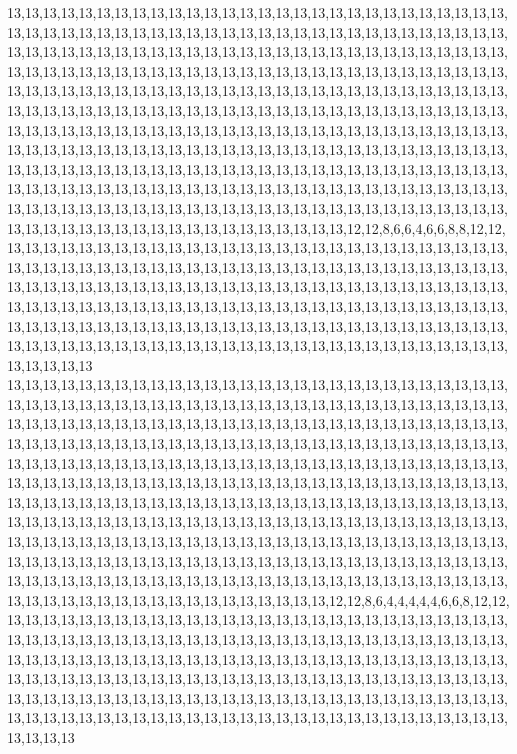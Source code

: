 13,13,13,13,13,13,13,13,13,13,13,13,13,13,13,13,13,13,13,13,13,13,13,13,13,13,13,13,13,13,13,13,13,13,13,13,13,13,13,13,13,13,13,13,13,13,13,13,13,13,13,13,13,13,13,13,13,13,13,13,13,13,13,13,13,13,13,13,13,13,13,13,13,13,13,13,13,13,13,13,13,13,13,13,13,13,13,13,13,13,13,13,13,13,13,13,13,13,13,13,13,13,13,13,13,13,13,13,13,13,13,13,13,13,13,13,13,13,13,13,13,13,13,13,13,13,13,13,13,13,13,13,13,13,13,13,13,13,13,13,13,13,13,13,13,13,13,13,13,13,13,13,13,13,13,13,13,13,13,13,13,13,13,13,13,13,13,13,13,13,13,13,13,13,13,13,13,13,13,13,13,13,13,13,13,13,13,13,13,13,13,13,13,13,13,13,13,13,13,13,13,13,13,13,13,13,13,13,13,13,13,13,13,13,13,13,13,13,13,13,13,13,13,13,13,13,13,13,13,13,13,13,13,13,13,13,13,13,13,13,13,13,13,13,13,13,13,13,13,13,13,13,13,13,13,13,13,13,13,13,13,13,13,13,13,13,13,13,13,13,13,13,13,13,13,13,13,13,13,13,13,13,13,13,13,13,13,13,13,13,13,13,13,13,13,13,13,13,13,13,13,13,13,13,13,13,13,13,13,13,13,13,13,13,13,13,13,13,13,13,13,13,13,13,13,13,13,12,12,8,6,6,4,6,6,8,8,12,12,13,13,13,13,13,13,13,13,13,13,13,13,13,13,13,13,13,13,13,13,13,13,13,13,13,13,13,13,13,13,13,13,13,13,13,13,13,13,13,13,13,13,13,13,13,13,13,13,13,13,13,13,13,13,13,13,13,13,13,13,13,13,13,13,13,13,13,13,13,13,13,13,13,13,13,13,13,13,13,13,13,13,13,13,13,13,13,13,13,13,13,13,13,13,13,13,13,13,13,13,13,13,13,13,13,13,13,13,13,13,13,13,13,13,13,13,13,13,13,13,13,13,13,13,13,13,13,13,13,13,13,13,13,13,13,13,13,13,13,13,13,13,13,13,13,13,13,13,13,13,13,13,13,13,13,13,13,13,13,13,13,13,13,13,13,13,13,13,13,13,13,13,13
13,13,13,13,13,13,13,13,13,13,13,13,13,13,13,13,13,13,13,13,13,13,13,13,13,13,13,13,13,13,13,13,13,13,13,13,13,13,13,13,13,13,13,13,13,13,13,13,13,13,13,13,13,13,13,13,13,13,13,13,13,13,13,13,13,13,13,13,13,13,13,13,13,13,13,13,13,13,13,13,13,13,13,13,13,13,13,13,13,13,13,13,13,13,13,13,13,13,13,13,13,13,13,13,13,13,13,13,13,13,13,13,13,13,13,13,13,13,13,13,13,13,13,13,13,13,13,13,13,13,13,13,13,13,13,13,13,13,13,13,13,13,13,13,13,13,13,13,13,13,13,13,13,13,13,13,13,13,13,13,13,13,13,13,13,13,13,13,13,13,13,13,13,13,13,13,13,13,13,13,13,13,13,13,13,13,13,13,13,13,13,13,13,13,13,13,13,13,13,13,13,13,13,13,13,13,13,13,13,13,13,13,13,13,13,13,13,13,13,13,13,13,13,13,13,13,13,13,13,13,13,13,13,13,13,13,13,13,13,13,13,13,13,13,13,13,13,13,13,13,13,13,13,13,13,13,13,13,13,13,13,13,13,13,13,13,13,13,13,13,13,13,13,13,13,13,13,13,13,13,13,13,13,13,13,13,13,13,13,13,13,13,13,13,13,13,13,13,13,13,13,13,13,13,13,13,13,13,13,13,13,13,13,13,13,13,13,13,13,13,13,13,13,13,13,13,12,12,8,6,4,4,4,4,4,6,6,8,12,12,13,13,13,13,13,13,13,13,13,13,13,13,13,13,13,13,13,13,13,13,13,13,13,13,13,13,13,13,13,13,13,13,13,13,13,13,13,13,13,13,13,13,13,13,13,13,13,13,13,13,13,13,13,13,13,13,13,13,13,13,13,13,13,13,13,13,13,13,13,13,13,13,13,13,13,13,13,13,13,13,13,13,13,13,13,13,13,13,13,13,13,13,13,13,13,13,13,13,13,13,13,13,13,13,13,13,13,13,13,13,13,13,13,13,13,13,13,13,13,13,13,13,13,13,13,13,13,13,13,13,13,13,13,13,13,13,13,13,13,13,13,13,13,13,13,13,13,13,13,13,13,13,13,13,13,13,13,13,13,13,13,13,13,13,13,13,13,13,13,13,13,13
